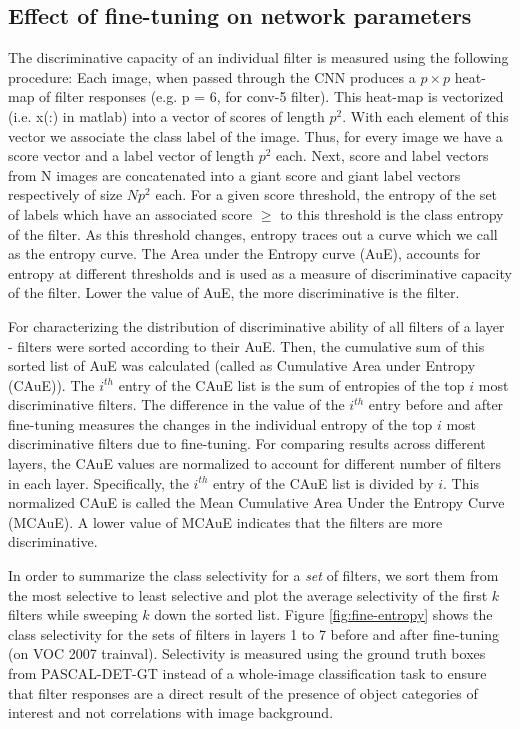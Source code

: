 \subsection{Effect of fine-tuning on network parameters}
\label{sub:fine-entropy}
The discriminative capacity of an individual filter is measured using the following procedure: Each image, when passed through the CNN produces a $p \times p$ heat-map of filter responses (e.g. p = 6, for conv-5 filter). This heat-map is vectorized (i.e. x(:) in matlab) into a vector of scores of length $p^2$. With each element of this vector we associate the class label of the image. Thus, for every image we have a score vector and a label vector of length $p^2$ each. Next, score and label vectors from N images are concatenated into a giant score and giant label vectors respectively of size $Np^2$ each. For a given score threshold, the entropy of the set of labels which have an associated score $\geq$ to this threshold is the class entropy of the filter. As this threshold changes, entropy traces out a curve which we call as the entropy curve. The Area under the Entropy curve (AuE), accounts for entropy at different thresholds and is used as a measure of discriminative capacity of the filter. Lower the value of AuE, the more discriminative is the filter. 

For characterizing the distribution of discriminative ability of all filters of a layer - filters were sorted according to their AuE. Then, the cumulative sum of this sorted list of AuE was calculated (called as Cumulative Area under Entropy (CAuE)). The $i^{th}$ entry of the CAuE list is the sum of entropies of the top $i$ most discriminative filters. The difference in the value of the $i^{th}$ entry before and after fine-tuning measures the changes in the individual entropy of the top $i$ most discriminative filters due to fine-tuning. For comparing results across different layers, the CAuE values are normalized to account for different number of filters in each layer. Specifically, the $i^{th}$ entry of the CAuE list is divided by $i$. This normalized CAuE is called the Mean Cumulative Area Under the Entropy Curve (MCAuE). A lower value of MCAuE indicates that the filters are more discriminative.

In order to summarize the class selectivity for a \emph{set} of filters, we sort them from the most selective to least selective and plot the average selectivity of the first $k$ filters while sweeping $k$ down the sorted list.
Figure \ref{fig:fine-entropy} shows the class selectivity for the sets of filters in layers 1 to 7 before and after fine-tuning (on VOC 2007 trainval).
Selectivity is measured using the ground truth boxes from PASCAL-DET-GT instead of a whole-image classification task to ensure that filter responses are a direct result of the presence of object categories of interest and not correlations with image background.

